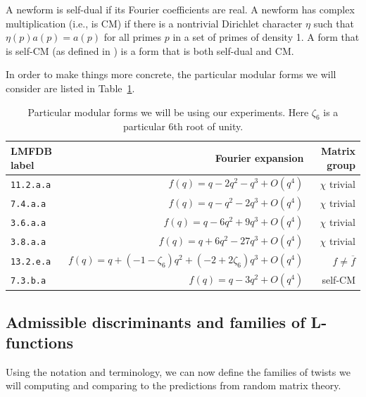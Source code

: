 \documentclass[11pt]{amsart}
\begin{document}
A newform is self-dual if its Fourier coefficients are real. A newform has complex multiplication (i.e., is CM) if there is a nontrivial Dirichlet character $\eta$ such that $\eta(p)a(p) = a (p)$ for all primes $p$ in a set of primes of density 1.  A form that is self-CM (as defined in \cite{bm}) is a form that is both self-dual and CM.


In order to make things more concrete, the particular modular forms we will consider are listed in Table~\ref{tbl:mfs}.

\begin{table}\small
\begin{tabular}{l|rr}
LMFDB label & Fourier expansion & Matrix group\\\hline\hline
\texttt{11.2.a.a} & $f(q)=  q - 2q^{2} - q^{3} + O(q^{4})$ & $\chi$ trivial\\
\texttt{7.4.a.a} & $f(q)=q - q^{2} - 2q^{3} + O(q^{4})$ & $\chi$ trivial\\
\texttt{3.6.a.a} & $f(q)=q - 6q^{2} + 9q^{3} + O(q^{4})$ & $\chi$ trivial\\
\texttt{3.8.a.a} & $f(q) = q + 6q^{2} - 27q^{3} + O(q^{4})$ & $\chi$ trivial\\\hline\hline
\texttt{13.2.e.a} & $f(q)= q + ( -1 - \zeta_{6} ) q^{2} + ( -2 + 2 \zeta_{6} ) q^{3} + O(q^{4})$ & $f\neq \overline{f}$\\\hline\hline
\texttt{7.3.b.a} & $f(q)= q - 3q^{2} + O(q^{4})$ & self-CM\\\hline\hline
\end{tabular}
\caption{Particular modular forms we will be using our experiments.  Here $\zeta_6$ is a particular $6$th root of unity.}\label{tbl:mfs}
\end{table}

\subsection{Admissible discriminants and families of L-functions}

Using the notation and terminology, we can now define the families of twists we will computing and comparing to the predictions from random matrix theory.
\end{document}
